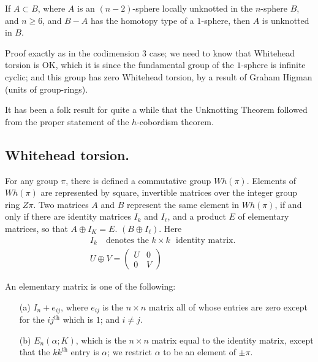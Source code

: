 \begin{rem}\label{chap8-rem3}
If $A\subset B$, where $A$ is an $(n-2)$-sphere locally unknotted in the $n$-sphere $B$, and $n\geq 6$, and $B-A$ has the homotopy type of a $1$-sphere, then $A$ is unknotted in $B$.
\end{rem}

Proof exactly as in the codimension $3$ case; we need to know that Whitehead torsion is OK, which it is since the fundamental group of the $1$-sphere is infinite cyclic; and this group has zero Whitehead torsion, by a result of Graham Higman (units of group-rings).


\begin{rem}\label{chap8-rem4}%
It has been a folk result for quite a while that the Unknotting Theorem followed from the proper statement of the $h$-cobordism theorem.
\end{rem}

\subsection{Whitehead torsion.}\label{chap8-sec8.3.6}
For any group $\pi$, there is defined a commutative group $Wh(\pi)$. Elements of $Wh(\pi)$ are represented by square, invertible matrices over the integer group ring $Z\pi$. Two matrices $A$ and $B$ represent the same element in $Wh(\pi)$, if and only if there are identity matrices $I_{k}$ and $I_{\ell}$, and a product $E$ of elementary matrices, so that $A\oplus I_{K}=E$. $(B\oplus I_{\ell})$. Here
\begin{align*}
& I_{k}\quad\text{denotes the } k\times k\text{~ identity matrix.}\\
& U\oplus V=
\begin{pmatrix}
U & 0\\
0 & V
\end{pmatrix}
\end{align*}

An elementary matrix is one of the following:
\begin{itemize}
\item[(a)] $I_{n}+e_{ij}$, where $e_{ij}$ is the $n\times n$ matrix all of whose entries are zero except for the $ij^{\text{th}}$ which is $1$; and $i\neq j$.

\item[(b)] $E_{n}(\alpha;K)$, which is the $n\times n$ matrix equal to the identity matrix, except that the $kk^{\text{th}}$ entry is $\alpha$; we restrict $\alpha$ to be an element of $\pm \pi$.
\end{itemize}

